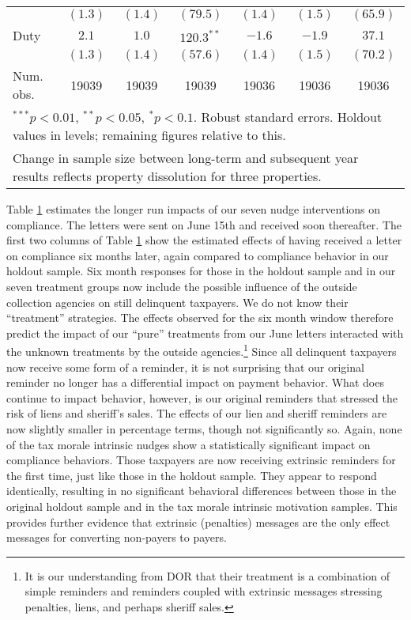 \documentclass[12pt]{article}
\begin{document}
\begin{table}[htbp]
\begin{center}
\begin{tabular}{l c c c c c c }
             & $(1.3)$      & $(1.4)$      & $(79.5)$      & $(1.4)$      & $(1.5)$      & $(65.9)$       \\
Duty         & $2.1$        & $1.0$        & $120.3^{**}$  & $-1.6$       & $-1.9$       & $37.1$         \\
             & $(1.3)$      & $(1.4)$      & $(57.6)$      & $(1.4)$      & $(1.5)$      & $(70.2)$       \\
\hline
Num. obs.    & 19039        & 19039        & 19039         & 19036        & 19036        & 19036          \\
\hline
\multicolumn{7}{l}{\scriptsize{$^{***}p<0.01$, $^{**}p<0.05$, $^*p<0.1$. Robust standard errors. Holdout values in levels; remaining figures relative to this.}} \\
\multicolumn{7}{l}{\scriptsize{Change in sample size between long-term and subsequent year results reflects property dissolution for three properties.}}
\end{tabular}
\label{ltmpme}
\end{center}
\end{table}

Table \ref{ltmpme} estimates the longer run impacts of our seven nudge
interventions on compliance.  The letters were sent on June 15th and
received soon thereafter.  The first two columns of Table \ref{ltmpme}
show the estimated effects of having received a letter on compliance
six months later, again compared to compliance behavior in our holdout
sample.  Six month responses for those in the holdout sample and in our
seven treatment groups now include the possible influence of the outside
collection agencies on still delinquent taxpayers. We do not know their ``treatment'' strategies. The
effects observed for the six month window therefore predict the impact of our
``pure'' treatments from our June letters interacted with the unknown treatments by the
outside agencies.\footnote{It is our understanding from DOR that their treatment is
a combination of simple reminders and reminders coupled with extrinsic messages stressing
penalties, liens, and perhaps sheriff sales.} Since all delinquent taxpayers now
receive some form of a reminder, it is not surprising that our original reminder
no longer has a differential impact on payment behavior. What does continue to
impact behavior, however, is our original reminders that stressed the risk of liens
and sheriff's sales. The effects of our lien and sheriff reminders are now slightly
smaller in percentage terms, though not significantly so. Again, none of the tax
morale intrinsic nudges show a statistically significant impact on compliance behaviors.
Those taxpayers are now receiving extrinsic reminders for the first time, just like those
in the holdout sample. They appear to respond identically, resulting in no significant
behavioral differences between those in the original holdout sample and in the tax morale
intrinsic motivation samples. This provides further evidence that extrinsic (penalties) messages
are the only effect messages for converting non-payers to payers.
\end{document}
